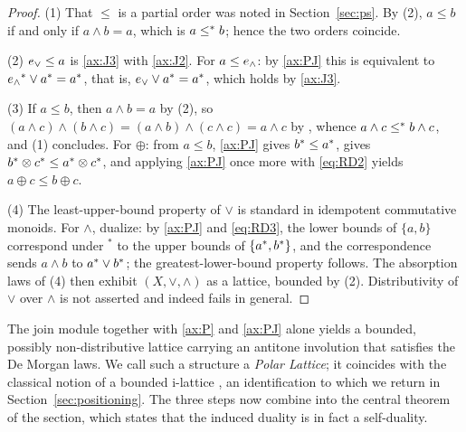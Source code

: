 \begin{proof}
(1) That $\leq$ is a partial order was noted in Section~\ref{sec:ps}. By
(2), $a \leq b$ if and only if $a \wedge b = a$, which
is $a \leq^{*} b$; hence the two orders coincide.

(2) $e_{\vee} \leq a$ is \eqref{ax:J3} with \eqref{ax:J2}. For $a \leq e_{\wedge}$:
by \eqref{ax:PJ} this is equivalent to
${e_{\wedge}}^{*} \vee {a}^{*} = {a}^{*}$, that is,
$e_{\vee} \vee {a}^{*} = {a}^{*}$, which holds by \eqref{ax:J3}.

(3) If $a \leq b$, then $a \wedge b = a$ by (2), so
$(a \wedge c) \wedge (b \wedge c) = (a \wedge b) \wedge (c \wedge c)
 = a \wedge c$
by , whence $a \wedge c \leq^{*} b \wedge c$, and
(1) concludes. For $\oplus$: from $a \leq b$, \eqref{ax:PJ} gives
${b}^{*} \leq {a}^{*}$,  gives
${b}^{*} \otimes {c}^{*} \leq {a}^{*} \otimes {c}^{*}$, and applying
\eqref{ax:PJ} once more with \eqref{eq:RD2} yields
$a \oplus c \leq b \oplus c$.

(4) The least-upper-bound property of $\vee$ is standard in idempotent
commutative monoids. For $\wedge$, dualize: by \eqref{ax:PJ} and
\eqref{eq:RD3}, the lower bounds of $\{a,b\}$ correspond under ${}^{*}$ to the
upper bounds of $\{{a}^{*},{b}^{*}\}$, and the correspondence sends
$a \wedge b$ to ${a}^{*} \vee {b}^{*}$; the greatest-lower-bound property
follows. The absorption laws of (4) then exhibit
$(X,\vee,\wedge)$ as a lattice, bounded by (2). Distributivity of $\vee$ over
$\wedge$ is not asserted and indeed fails in general.
\end{proof}

The join module together with \eqref{ax:P} and \eqref{ax:PJ} alone yields a
bounded, possibly non-distributive lattice carrying an antitone involution
that satisfies the De Morgan laws. We call such a structure a \emph{Polar
Lattice}; it coincides with the classical notion of a bounded i-lattice
\citep{Kalman1958}, an identification to which we return in
Section~\ref{sec:positioning}. The three steps now combine into the central
theorem of the section, which states that the induced duality is in fact a
self-duality.

